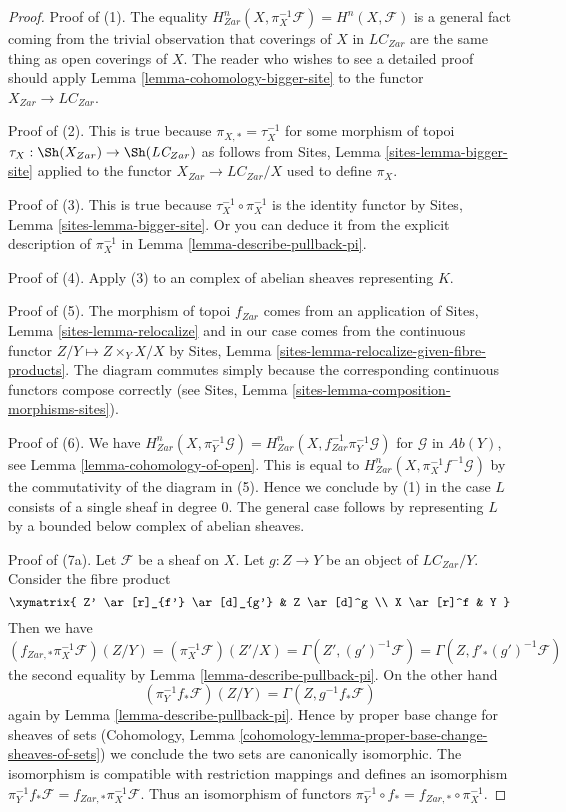 \begin{proof}
Proof of (1).
The equality $H^n_{Zar}(X, \pi_X^{-1}\mathcal{F}) = H^n(X, \mathcal{F})$
is a general fact coming from the trivial observation that
coverings of $X$ in $\textit{LC}_{Zar}$ are the same thing as open
coverings of $X$. The reader who wishes to see a detailed proof
should apply Lemma \ref{lemma-cohomology-bigger-site} to the functor
$X_{Zar} \to \textit{LC}_{Zar}$.

\medskip\noindent
Proof of (2). This is true because $\pi_{X, *} = \tau_X^{-1}$
for some morphism of topoi $\tau_X : \Sh(X_{Zar}) \to \Sh(\textit{LC}_{Zar})$
as follows from Sites, Lemma \ref{sites-lemma-bigger-site}
applied to the functor
$X_{Zar} \to \textit{LC}_{Zar}/X$ used to define $\pi_X$.

\medskip\noindent
Proof of (3). This is true because $\tau_X^{-1} \circ \pi_X^{-1}$
is the identity functor by Sites, Lemma \ref{sites-lemma-bigger-site}.
Or you can deduce it from the explicit description of
$\pi_X^{-1}$ in Lemma \ref{lemma-describe-pullback-pi}.

\medskip\noindent
Proof of (4). Apply (3) to an complex of abelian sheaves representing $K$.

\medskip\noindent
Proof of (5). The morphism of topoi $f_{Zar}$ comes from an application of
Sites, Lemma \ref{sites-lemma-relocalize}
and in our case comes from the continuous functor
$Z/Y \mapsto Z \times_Y X/X$ by
Sites, Lemma \ref{sites-lemma-relocalize-given-fibre-products}.
The diagram commutes simply because the corresponding
continuous functors compose correctly
(see Sites, Lemma \ref{sites-lemma-composition-morphisms-sites}).

\medskip\noindent
Proof of (6). We have
$H^n_{Zar}(X, \pi_Y^{-1}\mathcal{G}) =
H^n_{Zar}(X, f_{Zar}^{-1}\pi_Y^{-1}\mathcal{G})$
for $\mathcal{G}$ in $\textit{Ab}(Y)$, see
Lemma \ref{lemma-cohomology-of-open}.
This is equal to $H^n_{Zar}(X, \pi_X^{-1}f^{-1}\mathcal{G})$
by the commutativity of the diagram in (5).
Hence we conclude by (1) in the case $L$ consists of a single
sheaf in degree $0$. The general case follows by representing
$L$ by a bounded below complex of abelian sheaves.

\medskip\noindent
Proof of (7a). Let $\mathcal{F}$ be a sheaf on $X$.
Let $g : Z \to Y$ be an object of $\textit{LC}_{Zar}/Y$. Consider the
fibre product
$$
\xymatrix{
Z' \ar[r]_{f'} \ar[d]_{g'} & Z \ar[d]^g \\
X \ar[r]^f & Y
}
$$
Then we have
$$
(f_{Zar, *}\pi_X^{-1}\mathcal{F})(Z/Y) =
(\pi_X^{-1}\mathcal{F})(Z'/X)  =
\Gamma(Z', (g')^{-1}\mathcal{F})  =
\Gamma(Z, f'_*(g')^{-1}\mathcal{F})
$$
the second equality by Lemma \ref{lemma-describe-pullback-pi}.
On the other hand
$$
(\pi_Y^{-1}f_*\mathcal{F})(Z/Y) = \Gamma(Z, g^{-1}f_*\mathcal{F})
$$
again by Lemma \ref{lemma-describe-pullback-pi}.
Hence by proper base change for sheaves of sets
(Cohomology, Lemma \ref{cohomology-lemma-proper-base-change-sheaves-of-sets})
we conclude the two sets are canonically isomorphic.
The isomorphism is compatible with restriction mappings
and defines an isomorphism
$\pi_Y^{-1}f_*\mathcal{F} = f_{Zar, *}\pi_X^{-1}\mathcal{F}$.
Thus an isomorphism of functors
$\pi_Y^{-1} \circ f_* = f_{Zar, *} \circ \pi_X^{-1}$.


\end{proof}
